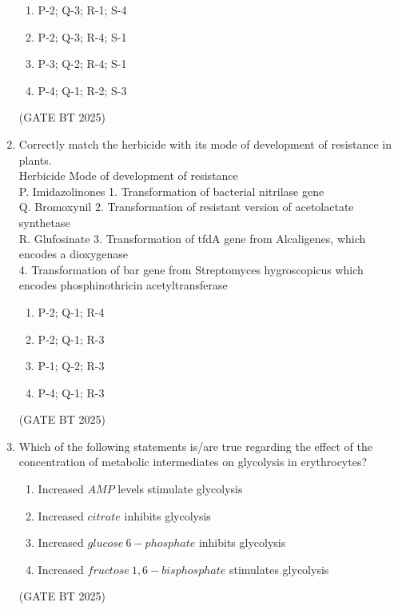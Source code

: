 \documentclass[journal,12pt,onecolumn]{IEEEtran}
\theoremstyle{remark}
\begin{document}
\begin{enumerate}
\begin{enumerate}
    \item P-2; Q-3; R-1; S-4
    \item P-2; Q-3; R-4; S-1
    \item P-3; Q-2; R-4; S-1
    \item P-4; Q-1; R-2; S-3
\end{enumerate}
\hfill (GATE BT 2025)

\item Correctly match the herbicide with its mode of development of resistance in plants.\\

Herbicide \hspace{1cm} Mode of development of resistance \\
P. Imidazolinones \hspace{0.5cm} 1. Transformation of bacterial nitrilase gene \\
Q. Bromoxynil \hspace{1.3cm} 2. Transformation of resistant version of acetolactate synthetase \\
R. Glufosinate \hspace{1.3cm} 3. Transformation of tfdA gene from Alcaligenes, which encodes a dioxygenase \\
\hspace{3cm} 4. Transformation of bar gene from Streptomyces hygroscopicus which encodes phosphinothricin acetyltransferase

\begin{enumerate}
    \item P-2; Q-1; R-4
    \item P-2; Q-1; R-3
    \item P-1; Q-2; R-3
    \item P-4; Q-1; R-3
\end{enumerate}
\hfill (GATE BT 2025)

\item Which of the following statements is/are true regarding the effect of the concentration of metabolic intermediates on glycolysis in erythrocytes?

\begin{enumerate}
    \item Increased $AMP$ levels stimulate glycolysis
    \item Increased $citrate$ inhibits glycolysis
    \item Increased $glucose\ 6\!-\!phosphate$ inhibits glycolysis
    \item Increased $fructose\ 1,6\!-\!bisphosphate$ stimulates glycolysis
\end{enumerate}
\hfill (GATE BT 2025)


\end{enumerate}
\end{document}

